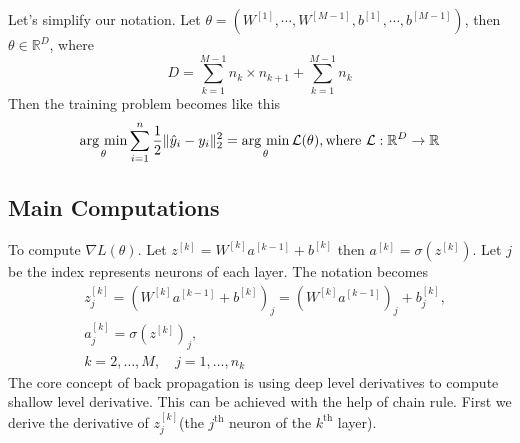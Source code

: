 \documentclass[../main.tex]{subfiles}
\begin{document}
            Let's simplify our notation. Let $\theta=(W^{ [1] },\cdots,W^{
                [M-1] },b^{ [1] },\cdots,b^{ [M-1] })$, then
                $\theta\in\mathbb{R}^D$, where
            \[
                D = \sum_{k=1}^{M-1} n_k \times n_{k+1} + \sum_{k=1}^{M-1} n_k
            \]
            Then the training problem becomes like this
            \begin{equation*}
                \operatorname*{arg~min}_\theta \sum_{i=1}^n \frac{1}{2} \| \hat{y}_{i} - y_i
                \|_2^2 = \operatorname*{arg~min}_\theta \mathcal{L}(\theta)
                ,\mathrm{where~} \mathcal{L}:\mathbb{R}^D \rightarrow \mathbb{R}
            \end{equation*}

        \subsection{Main Computations}
            To compute $\nabla L(\theta)$. Let $z^{ [k] } = W^{ [k] } a^{ [k-1] } + b^{ [k] }$ then $a^{ [k] } = \sigma(z^{ [k] })$.
            Let $j$ be the index represents neurons of each layer. The notation becomes
            \begin{align*}
                & z_j^{[k]}=(W^{[k]}a^{[k-1]}+b^{[k]})_j=(W^{[k]}a^{[k-1]})_j+b_j^{[k]}, \\
                & a_j^{[k]}=\sigma(z^{[k]})_j, \\
                & k=2,\dots,M,\quad j=1,\dots,n_k
            \end{align*}
            The core concept of back propagation is using deep level derivatives to compute shallow level derivative. This can be achieved with the help of chain rule. First we derive the derivative of $z^{[k]}_j$(the $j^\mathrm{th}$ neuron of the $k^\mathrm{th}$ layer).
\end{document}
